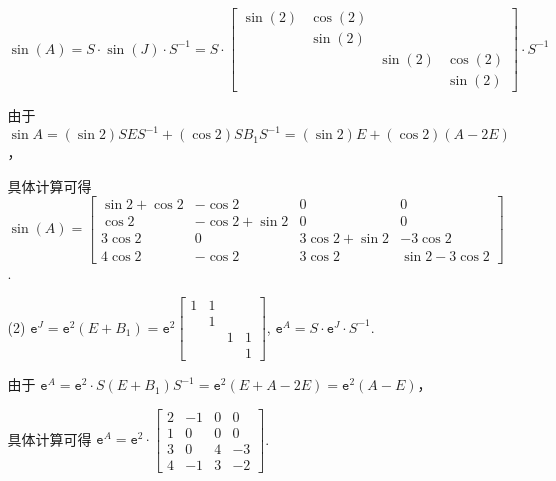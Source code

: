 \documentclass{article}
\begin{document}
\begin{spacing}{1.5}
\begin{itemize}
\begin{itemize}
        $\sin(A) = S \cdot \sin(J) \cdot S^{-1} = S \cdot \left[\begin{array}{cccc}\sin(2)&\cos(2)&&\\&\sin(2)&&\\&&\sin(2)&\cos(2)\\&&&\sin(2)\end{array}\right] \cdot S^{-1}$

        由于 $\sin A = (\sin 2) SES^{-1} + (\cos 2) SB_1S^{-1} = (\sin 2) E + (\cos 2) (A - 2E)$，

        具体计算可得 $\sin(A) = \left[\begin{array}{cccc}\sin 2 + \cos 2&-\cos 2&0&0\\\cos 2&-\cos 2 + \sin 2 & 0 & 0\\3\cos 2&0&3\cos 2 + \sin 2& -3\cos 2\\4\cos 2&-\cos 2&3\cos 2&\sin 2 - 3\cos 2\end{array}\right]$.

        
        \item [(2)] $\mathtt{e}^J = \mathtt{e}^{2}(E + B_1) = \mathtt{e}^{2} \left[\begin{array}{cccc}1&1&&\\&1&&\\&&1&1\\&&&1\end{array}\right]$, $\mathtt{e}^{A} = S\cdot \mathtt{e}^{J}\cdot S^{-1}$.

        由于 $\mathtt{e}^A = \mathtt{e}^2 \cdot S(E+B_1)S^{-1} = \mathtt{e}^2 (E + A - 2E) = \mathtt{e}^2 (A - E)$，

        具体计算可得 $\mathtt{e}^A = \mathtt{e}^2\cdot \left[\begin{array}{cccc}2&-1&0&0\\1&0&0&0\\3&0&4&-3\\4&-1&3&-2\end{array}\right]$.

    \end{itemize}

\end{itemize}

\end{spacing}
\end{document}
